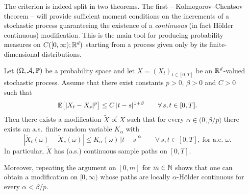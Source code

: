 \medskip
The criterion is indeed split in two theorems. The first -- Kolmogorov--Chentsov theorem -- will provide sufficient moment conditions on the increments
of a stochastic process guaranteeing the existence of a \emph{continuous} (in fact H\"older continuous)
modification. This is the main tool for producing probability measures on
$C([0,\infty);\mathbb{R}^d)$ starting from a process given only by its finite-dimensional distributions.

\begin{theorem}\label{thm:kolmogorov_chentsov}
Let $(\Omega,\mathcal{A},\mathbb{P})$ be a probability space and let
$X=(X_t)_{t\in[0,T]}$ be an $\mathbb{R}^d$-valued stochastic process.
Assume that there exist constants $p>0$, $\beta>0$ and $C>0$ such that
\begin{equation}\label{eq:KC_assumption}
\mathbb{E}\bigl[|X_t-X_s|^p\bigr]\le C\,|t-s|^{1+\beta}
\qquad\forall\, s,t\in[0,T].
\end{equation}
Then there exists a modification $\widetilde X$ of $X$ such that
for every $\alpha\in\bigl(0,\beta/p\bigr)$ there exists an a.s.\ finite random variable
$K_\alpha$ with
\begin{equation}\label{eq:KC_holder}
|\widetilde X_t(\omega)-\widetilde X_s(\omega)|
\le K_\alpha(\omega)\,|t-s|^\alpha
\qquad \forall\, s,t\in[0,T],\ \text{for a.e.\ }\omega.
\end{equation}
In particular, $\widetilde X$ has (a.s.) continuous sample paths on $[0,T]$.

Moreover, repeating the argument on $[0,m]$ for $m\in\mathbb{N}$ shows that one can obtain a modification
on $[0,\infty)$ whose paths are locally $\alpha$-H\"older continuous for every $\alpha<\beta/p$.
\end{theorem}

